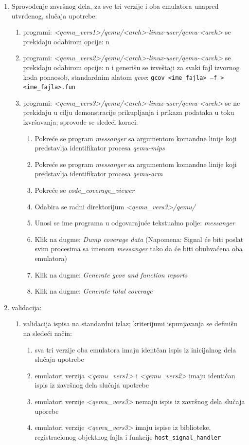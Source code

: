 \documentclass[12pt,oneside]{memoir}
\newcommand{\kod}[1]{\texttt{#1}}
\newcommand{\strano}[1]{\textit{#1}}
\begin{document}
\begin{enumerate}
\item Sprovođenje završnog dela, za sve tri verzije i oba emulatora unapred utvrđenog, slučaja upotrebe:
\begin{enumerate}
\item programi: \strano{<qemu\_vers1>/qemu/<arch>-linux-user/qemu-<arch>} se prekidaju odabirom opcije: n
\item programi: \strano{<qemu\_vers2>/qemu/<arch>-linux-user/qemu-<arch>} se prekidaju odabirom opcije: n i generišu se izveštaji za svaki fajl izvornog koda ponaosob, standardnim alatom \strano{gcov}:
\kod{gcov <ime\_fajla> –f  > <ime\_fajla>.fun}
\item programi: \strano{<qemu\_vers3>/qemu/<arch>-linux-user/qemu-<arch>} se ne prekidaju u cilju demonstracije prikupljanja i prikaza podataka u toku izvršavanja; sprovode se sledeći koraci:
\begin{enumerate}
\item Pokreće se program \strano{messanger} sa argumentom komandne linije koji predstavlja identifikator procesa \strano{qemu-mips}
\item Pokreće se program \strano{messanger} sa argumentom komandne linije koji predstavlja identifikator procesa \strano{qemu-arm}
\item Pokreće se \strano{code\_coverage\_viewer}
\item Odabira se radni direktorijum \strano{<qemu\_vers3>/qemu/}
\item Unosi se ime programa u odgovarajuće tekstualno polje: \strano{messanger}
\item  Klik na dugme: \strano{Dump coverage data} (Napomena: Signal će biti poslat svim procesima sa imenom \strano{messanger} tako da će biti obuhvaćena oba emulatora)
\item Klik na dugme: \strano{Generate gcov and function reports}
\item Klik na dugme: \strano{Generate total coverage}
\end{enumerate}
\end{enumerate}

\item validacija: 
\begin{enumerate}
\item validacija ispisa na standardni izlaz; kriterijumi ispunjavanja se definišu na sledeći način:
\begin{enumerate}
\item sva tri verzije oba emulatora imaju identčan ispis iz inicijalnog dela slučaja upotrebe
\item emulatori verzija \strano{<qemu\_vers1>} i \strano{<qemu\_vers2>} imaju identičan ispis iz završnog dela slučaja upotrebe
\item emulatori verzije \strano{<qemu\_vers3>} nemaju ispis iz završnog dela slučaja uporebe
\item emulatori verzije \strano{<qemu\_vers3>} imaju ispise iz biblioteke, registracionog objektnog fajla i funkcije \kod{host\_signal\_handler}
\end{enumerate}


\end{enumerate}
\end{enumerate}
\end{document}
